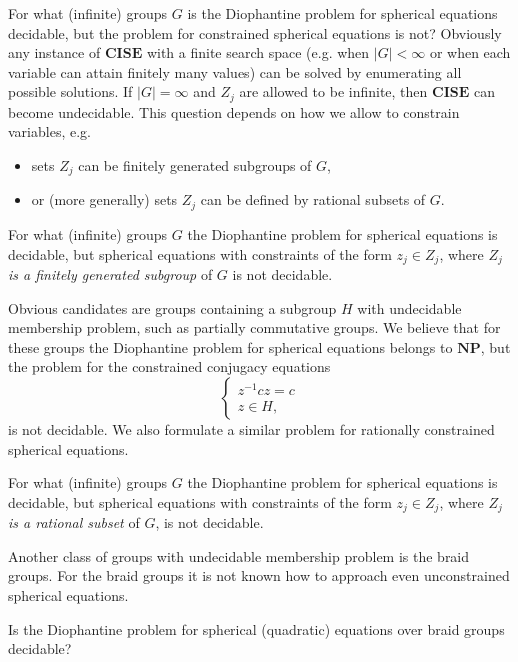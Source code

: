 \documentclass{jgcc}
\def\NP{{\mathbf{NP}}}
\def\CISE{{\mathbf{CISE}}}
\begin{document}
For what (infinite) groups $G$ is the Diophantine problem for spherical equations decidable,
but the problem for constrained spherical equations is not?
Obviously any instance of $\CISE$ with a finite search space
(e.g. when $|G|<\infty$ or when each variable can attain finitely many values)
can be solved by enumerating all possible solutions. 
If $|G|=\infty$ and $Z_j$ are allowed to be infinite,
then $\CISE$ can become undecidable.
This question depends on how we allow to constrain variables, e.g.
\begin{itemize}
\item 
sets $Z_j$ can be finitely generated subgroups of $G$,
\item 
or (more generally) sets $Z_j$ can be defined by rational subsets of $G$.
\end{itemize}

\begin{prob}
For what (infinite) groups $G$ the Diophantine problem for spherical
equations is decidable, but spherical equations with 
constraints of the form $z_j\in Z_j$, where \emph{$Z_j$ is 
a finitely generated subgroup} of $G$ is not decidable. 
\end{prob}

Obvious candidates are groups containing a subgroup $H$
with undecidable membership problem, such as partially commutative groups.
We believe that for these groups the Diophantine problem for
spherical equations belongs to $\NP$, but the problem for
the constrained conjugacy equations
$$
\left\{
\begin{array}{l}
z^{-1} c z = c\\
z\in H,
\end{array}
\right.
$$
is not decidable. We also formulate a similar problem for
rationally constrained spherical equations.

\begin{prob}
For what (infinite) groups $G$ the Diophantine problem for spherical
equations is decidable, but spherical equations with 
constraints of the form $z_j\in Z_j$, where \emph{$Z_j$ is 
a rational subset} of $G$, is not decidable.
\end{prob}

Another class of groups with undecidable membership problem is the 
braid groups. For the braid groups it is not 
known how to approach even unconstrained spherical equations.

\begin{prob}
Is the Diophantine problem for spherical (quadratic)
equations over braid groups decidable?
\end{prob}
\end{document}
